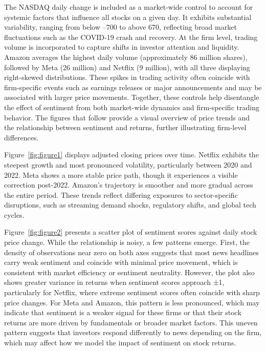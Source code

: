 \documentclass[12pt]{article}
\begin{document}
The NASDAQ daily change is included as a market-wide control to account for systemic factors that influence all stocks on a given day. It exhibits substantial variability, ranging from below –700 to above 670, reflecting broad market fluctuations such as the COVID-19 crash and recovery. At the firm level, trading volume is incorporated to capture shifts in investor attention and liquidity. Amazon averages the highest daily volume (approximately 86 million shares), followed by Meta (26 million) and Netflix (9 million), with all three displaying right-skewed distributions. These spikes in trading activity often coincide with firm-specific events such as earnings releases or major announcements and may be associated with larger price movements. Together, these controls help disentangle the effect of sentiment from both market-wide dynamics and firm-specific trading behavior. The figures that follow provide a visual overview of price trends and the relationship between sentiment and returns, further illustrating firm-level differences.

Figure~\ref{fig:figure1} displays adjusted closing prices over time. Netflix exhibits the steepest growth and most pronounced volatility, particularly between 2020 and 2022. Meta shows a more stable price path, though it experiences a visible correction post-2022. Amazon’s trajectory is smoother and more gradual across the entire period. These trends reflect differing exposures to sector-specific disruptions, such as streaming demand shocks, regulatory shifts, and global tech cycles.

Figure~\ref{fig:figure2} presents a scatter plot of sentiment scores against daily stock price change. While the relationship is noisy, a few patterns emerge. First, the density of observations near zero on both axes suggests that most news headlines carry weak sentiment and coincide with minimal price movement, which is consistent with market efficiency or sentiment neutrality. However, the plot also shows greater variance in returns when sentiment scores approach ±1, particularly for Netflix, where extreme sentiment scores often coincide with sharp price changes. For Meta and Amazon, this pattern is less pronounced, which may indicate that sentiment is a weaker signal for these firms or that their stock returns are more driven by fundamentals or broader market factors. This uneven pattern suggests that investors respond differently to news depending on the firm, which may affect how we model the impact of sentiment on stock returns.
\end{document}
